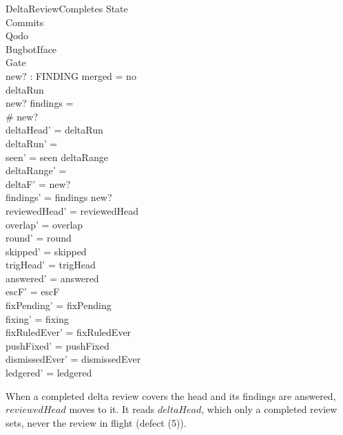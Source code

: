 \documentclass{article}
\begin{document}
\begin{schema}{DeltaReviewCompletes}
  \Delta State \\
  \Xi Commits \\
  \Xi Qodo \\
  \Xi BugbotIface \\
  \Xi Gate \\
  new? : \power FINDING
\where
  merged = no \\
  deltaRun \neq \emptyset \\
  new? \cap findings = \emptyset \\
  \# new?  \\
  deltaHead' = deltaRun \\
  deltaRun' = \emptyset \\
  seen' = seen \cup deltaRange \\
  deltaRange' = \emptyset \\
  deltaF' = new? \\
  findings' = findings \cup new? \\
  reviewedHead' = reviewedHead \\
  overlap' = overlap \\
  round' = round \\
  skipped' = skipped \\
  trigHead' = trigHead \\
  answered' = answered \\
  escF' = escF \\
  fixPending' = fixPending \\
  fixing' = fixing \\
  fixRuledEver' = fixRuledEver \\
  pushFixed' = pushFixed \\
  dismissedEver' = dismissedEver \\
  ledgered' = ledgered
\end{schema}

When a completed delta review covers the head and its findings are answered,
$reviewedHead$ moves to it. It reads $deltaHead$, which only a completed review
sets, never the review in flight (defect (5)).
\end{document}

